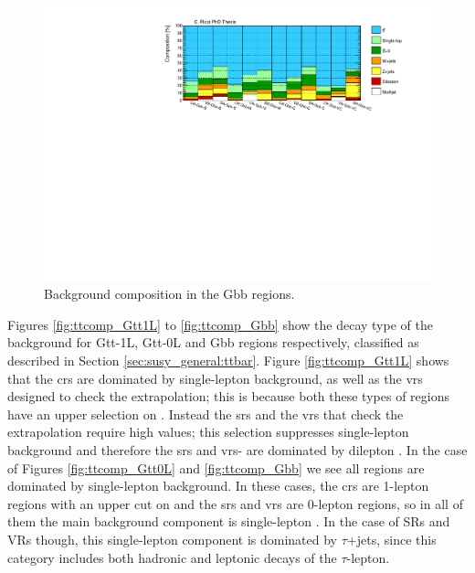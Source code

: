 \begin{figure}[htbp]
\includegraphics[width=\textwidth]{figures/strong_prod/comp_plots/Gbb_bkg.pdf}
\caption{Background composition in the Gbb regions.}
	\label{fig:bkgcomp_Gbb}
\end{figure}


Figures \ref{fig:ttcomp_Gtt1L} to \ref{fig:ttcomp_Gbb} show the decay type of the \ttbar background for  Gtt-1L, Gtt-0L and Gbb regions respectively, classified as described in Section \ref{sec:susy_general:ttbar}.
Figure \ref{fig:ttcomp_Gtt1L} shows that the \glspl{cr} are dominated by single-lepton \ttbar background, as well as the \glspl{vr} designed to check the \mtb extrapolation;
this is because both these types of regions have an upper selection on \mt.
Instead the \glspl{sr} and the \glspl{vr} that check the \mt extrapolation require high \mt values;
this selection suppresses single-lepton \ttbar background and therefore the \glspl{sr} and \glspl{vr}-\mt
are dominated by dilepton \ttbar.
In the case of Figures \ref{fig:ttcomp_Gtt0L} and \ref{fig:ttcomp_Gbb} we see all regions are dominated by single-lepton \ttbar background.
In these cases, the \glspl{cr} are 1-lepton regions with an upper cut on \mt and the \glspl{sr} and \glspl{vr} are 0-lepton regions,
so in all of them the main background component is  single-lepton \ttbar. In the case of SRs and VRs though, this single-lepton component
is dominated by $\tau$+jets, since this category includes both hadronic and leptonic decays of the $\tau$-lepton.


